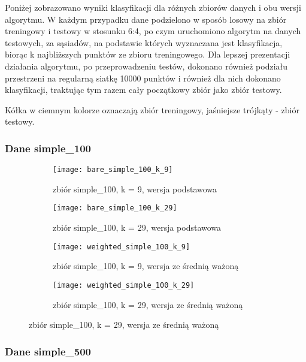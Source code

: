 \documentclass{scrartcl}
\begin{document}
Poniżej zobrazowano wyniki klasyfikacji dla różnych zbiorów danych i obu wersji algorytmu. W każdym przypadku dane podzielono w sposób losowy na zbiór treningowy i testowy w stosunku 6:4, po czym uruchomiono algorytm na danych testowych, za sąsiadów, na podstawie których wyznaczana jest klasyfikacja, biorąc k najbliższych punktów ze zbioru treningowego. Dla lepszej prezentacji działania algorytmu, po przeprowadzeniu testów, dokonano również podziału przestrzeni na regularną siatkę 10000 punktów i również dla nich dokonano klasyfikacji, traktując tym razem cały początkowy zbiór jako zbiór testowy.

Kółka w ciemnym kolorze oznaczają zbiór treningowy, jaśniejsze trójkąty - zbiór testowy.

\subsubsection*{Dane simple\_100}

\begin{figure}[H]
	\centering
	\begin{subfigure}[b]{0.4\linewidth}
		\texttt{[image: bare\_simple\_100\_k\_9]}
		\caption{zbiór simple\_100, k = 9, wersja podstawowa}
	\end{subfigure}
	\begin{subfigure}[b]{0.4\linewidth}
		\texttt{[image: bare\_simple\_100\_k\_29]}
		\caption{zbiór simple\_100, k = 29, wersja podstawowa}
	\end{subfigure}
	\begin{subfigure}[b]{0.4\linewidth}
		\texttt{[image: weighted\_simple\_100\_k\_9]}
		\caption{zbiór simple\_100, k = 9, wersja ze średnią ważoną}
	\end{subfigure}
	\begin{subfigure}[b]{0.4\linewidth}
		\texttt{[image: weighted\_simple\_100\_k\_29]}
		\caption{zbiór simple\_100, k = 29, wersja ze średnią ważoną}
	\end{subfigure}
\end{figure}

\subsubsection*{Dane simple\_500}
\end{document}

